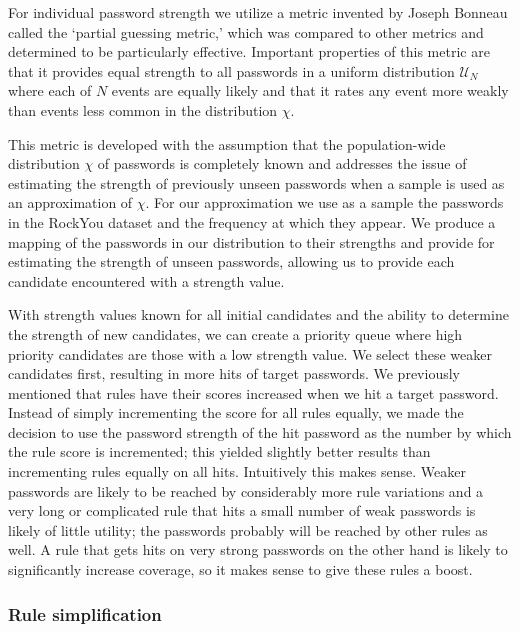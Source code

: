 \documentclass[letterpaper,twocolumn,10pt]{article}
\begin{document}
For individual password strength we utilize a metric invented by Joseph Bonneau
called the `partial guessing metric,'\cite{bonneau2012statistical} which was
compared to other metrics and determined to be particularly effective.
Important properties of this metric are that it provides equal strength to all
passwords in a uniform distribution $\mathcal{U}_{N}$ %
where each of $N$ events are equally likely and that it rates any event more
weakly than events less common in the distribution $\chi$.

This metric is developed with the assumption that the population-wide
distribution $\chi$ of passwords is completely known and addresses the issue of
estimating the strength of previously unseen passwords when a sample is used as
an approximation of $\chi$. For our approximation we use as a sample the
passwords in the RockYou dataset and the frequency at which they appear. We
produce a mapping of the passwords in our distribution to their strengths and
provide for estimating the strength of unseen passwords, allowing us to provide
each candidate encountered with a strength value.

With strength values known for all initial candidates and the ability to
determine the strength of new candidates, we can create a priority queue where
high priority candidates are those with a low strength value. We select these
weaker candidates first, resulting in more hits of target passwords. We
previously mentioned that rules have their scores increased when we hit a target
password. Instead of simply incrementing the score for all rules equally, we
made the decision to use the password strength of the hit password as the
number by which the rule score is incremented; this yielded slightly better
results than incrementing rules equally on all hits. Intuitively this makes
sense. Weaker passwords are likely to be reached by considerably more rule
variations and a very long or complicated rule that hits a small number of
weak passwords is likely of little utility; the passwords probably will be
reached by other rules as well. A rule that gets hits on very strong passwords
on the other hand is likely to significantly increase coverage, so it makes
sense to give these rules a boost.



\subsubsection{Rule simplification}
\end{document}
